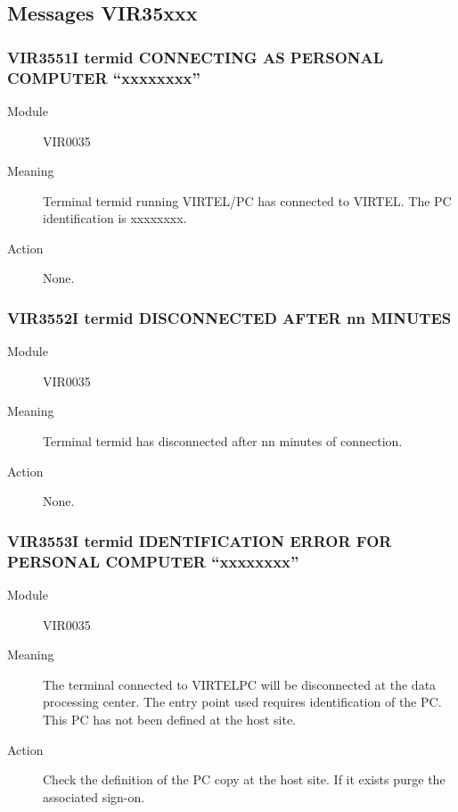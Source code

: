 \documentclass[letterpaper,10pt,english]{sphinxmanual}
\begin{document}
\subsection{Messages VIR35xxx}
\label{\detokenize{messages:messages-vir35xxx}}

\subsubsection{VIR3551I termid CONNECTING AS PERSONAL COMPUTER “xxxxxxxx”}
\label{\detokenize{messages:vir3551i-termid-connecting-as-personal-computer-xxxxxxxx}}\begin{description}
\item[{Module}] \leavevmode
VIR0035

\item[{Meaning}] \leavevmode
Terminal termid running VIRTEL/PC has connected to VIRTEL. The PC identification is xxxxxxxx.

\item[{Action}] \leavevmode
None.

\end{description}


\subsubsection{VIR3552I termid DISCONNECTED AFTER nn MINUTES}
\label{\detokenize{messages:vir3552i-termid-disconnected-after-nn-minutes}}\begin{description}
\item[{Module}] \leavevmode
VIR0035

\item[{Meaning}] \leavevmode
Terminal termid has disconnected after nn minutes of connection.

\item[{Action}] \leavevmode
None.

\end{description}


\subsubsection{VIR3553I termid IDENTIFICATION ERROR FOR PERSONAL COMPUTER “xxxxxxxx”}
\label{\detokenize{messages:vir3553i-termid-identification-error-for-personal-computer-xxxxxxxx}}\begin{description}
\item[{Module}] \leavevmode
VIR0035

\item[{Meaning}] \leavevmode
The terminal connected to VIRTELPC will be disconnected at the data processing center. The entry point used requires identification of the PC. This PC has not been defined at the host site.

\item[{Action}] \leavevmode
Check the definition of the PC copy at the host site. If it exists purge the associated sign-on.

\end{description}
\end{document}
